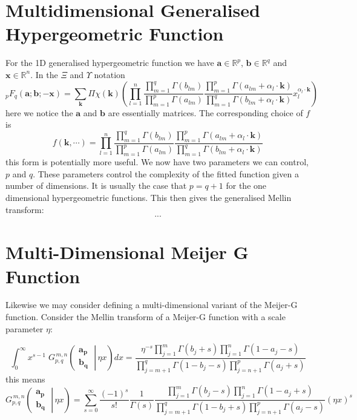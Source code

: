 \documentclass[journal=jcisd8,manuscript=article,layout=onecolumn,pdftex,floatfix,amsmath,amssymb,10pt]{achemso}
\begin{document}
\section{Multidimensional Generalised Hypergeometric Function}
For the 1D generalised hypergeometric function we have $\mathbf{a} \in \mathbb{R}^p$, $\mathbf{b} \in \mathbb{R}^q$ and $\mathbf{x} \in \mathbb{R}^n$. In the $\Xi$ and $\Upsilon$ notation
\begin{equation}
_pF_q(\mathbf{a};\mathbf{b};-\mathbf{x}) = \sum_{\mathbf{k}} \Pi\chi(\mathbf{k})     \left(\prod_{l=1}^n \frac{\prod_{m=1}^q \Gamma(b_{lm})}{\prod_{m=1}^p \Gamma(a_{lm})} \frac{\prod_{m=1}^p \Gamma(a_{lm} + \alpha_l \cdot \mathbf{k})}{\prod_{m=1}^q \Gamma(b_{lm} + \alpha_l \cdot \mathbf{k})} x_l^{\alpha_l \cdot \mathbf{k}}\right)
\end{equation}
here we notice the $\mathbf{a}$ and $\mathbf{b}$ are essentially matrices. The corresponding choice of $f$ is
\begin{equation}
f(\mathbf{k},\cdots) = \prod_{l=1}^n \frac{\prod_{m=1}^q \Gamma(b_{lm})}{\prod_{m=1}^p \Gamma(a_{lm})} \frac{\prod_{m=1}^p \Gamma(a_{lm} + \alpha_l \cdot \mathbf{k})}{\prod_{m=1}^q \Gamma(b_{lm} + \alpha_l \cdot \mathbf{k})}
\end{equation}
this form is potentially more useful. We now have two parameters we can control, $p$ and $q$. These parameters control the complexity of the fitted function given a number of dimensions. It is usually the case that $p=q+1$ for the one dimensional hypergeometric functions. This then gives the generalised Mellin transform:
$$
...
$$

\section{Multi-Dimensional Meijer G Function}
Likewise we may consider defining a multi-dimensional variant of the Meijer-G function. Consider the Mellin transform of a Meijer-G function with a scale parameter $\eta$:

\begin{equation}
\int_0^{\infty} x^{s - 1} \; G_{p,q}^{\,m,n} \!\left( \left. \begin{matrix} \mathbf{a_p} \\ \mathbf{b_q} \end{matrix} \; \right| \, \eta x \right) dx =
\frac{\eta^{-s} \prod_{j = 1}^{m} \Gamma (b_j + s) \prod_{j = 1}^{n} \Gamma (1 - a_j - s)} {\prod_{j = m + 1}^{q} \Gamma (1 - b_j - s) \prod_{j = n + 1}^{p} \Gamma (a_j + s)}
\end{equation}
this means
\begin{equation}
G_{p,q}^{\,m,n} \!\left( \left. \begin{matrix} \mathbf{a_p} \\ \mathbf{b_q} \end{matrix} \; \right| \, \eta x \right) = \sum_{s=0}^\infty \frac{(-1)^s}{s!} \frac{1}{\Gamma(s)} \frac{\prod_{j = 1}^{m} \Gamma (b_j - s) \prod_{j = 1}^{n} \Gamma (1 - a_j + s)} {\prod_{j = m + 1}^{q} \Gamma (1 - b_j + s) \prod_{j = n + 1}^{p} \Gamma (a_j - s)} (\eta x)^s
\end{equation}
\end{document}
